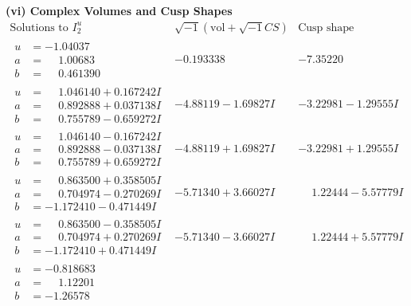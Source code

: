 \documentclass[1p]{elsarticle_modified}
\theoremstyle{definition}
\newcommand{\I}{\sqrt{-1}}
\begin{document}
\newpage\flushleft \textbf{(vi) Complex Volumes and Cusp Shapes}
$$\begin{array}{c|c|c}  
\text{Solutions to }I^u_{2}& \I (\text{vol} + \sqrt{-1}CS) & \text{Cusp shape}\\
 \hline 
\begin{aligned}
u &= -1.04037\phantom{ +0.000000I} \\
a &= \phantom{-}1.00683\phantom{ +0.000000I} \\
b &= \phantom{-}0.461390\phantom{ +0.000000I}\end{aligned}
 & -0.193338\phantom{ +0.000000I} & -7.35220\phantom{ +0.000000I} \\ \hline\begin{aligned}
u &= \phantom{-}1.046140 + 0.167242 I \\
a &= \phantom{-}0.892888 + 0.037138 I \\
b &= \phantom{-}0.755789 - 0.659272 I\end{aligned}
 & -4.88119 - 1.69827 I & -3.22981 - 1.29555 I \\ \hline\begin{aligned}
u &= \phantom{-}1.046140 - 0.167242 I \\
a &= \phantom{-}0.892888 - 0.037138 I \\
b &= \phantom{-}0.755789 + 0.659272 I\end{aligned}
 & -4.88119 + 1.69827 I & -3.22981 + 1.29555 I \\ \hline\begin{aligned}
u &= \phantom{-}0.863500 + 0.358505 I \\
a &= \phantom{-}0.704974 - 0.270269 I \\
b &= -1.172410 - 0.471449 I\end{aligned}
 & -5.71340 + 3.66027 I & \phantom{-}1.22444 - 5.57779 I \\ \hline\begin{aligned}
u &= \phantom{-}0.863500 - 0.358505 I \\
a &= \phantom{-}0.704974 + 0.270269 I \\
b &= -1.172410 + 0.471449 I\end{aligned}
 & -5.71340 - 3.66027 I & \phantom{-}1.22444 + 5.57779 I \\ \hline\begin{aligned}
u &= -0.818683\phantom{ +0.000000I} \\
a &= \phantom{-}1.12201\phantom{ +0.000000I} \\
b &= -1.26578\phantom{ +0.000000I}\end{aligned}

\end{array}$$
\end{document}
